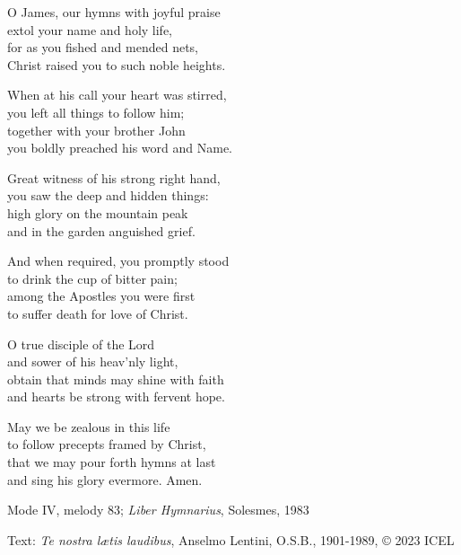 \hymn

\begin{hymnverse}
O James, our hymns with joyful praise\\
extol your name and holy life,\\
for as you fished and mended nets,\\
Christ raised you to such noble heights.

When at his call your heart was stirred,\\
you left all things to follow him;\\
together with your brother John\\
you boldly preached his word and Name.

Great witness of his strong right hand,\\
you saw the deep and hidden things:\\
high glory on the mountain peak\\
and in the garden anguished grief.

And when required, you promptly stood\\
to drink the cup of bitter pain;\\
among the Apostles you were first\\
to suffer death for love of Christ.

O true disciple of the Lord\\
and sower of his heav’nly light,\\
obtain that minds may shine with faith\\
and hearts be strong with fervent hope.

May we be zealous in this life\\
to follow precepts framed by Christ,\\
that we may pour forth hymns at last\\
and sing his glory evermore. Amen.
\end{hymnverse}

\begin{hymnsource}
Mode IV, melody 83; \emph{Liber Hymnarius}, Solesmes, 1983

Text: \emph{Te nostra lætis laudibus}, Anselmo Lentini, O.S.B., 1901-1989, © 2023 ICEL
\end{hymnsource}
